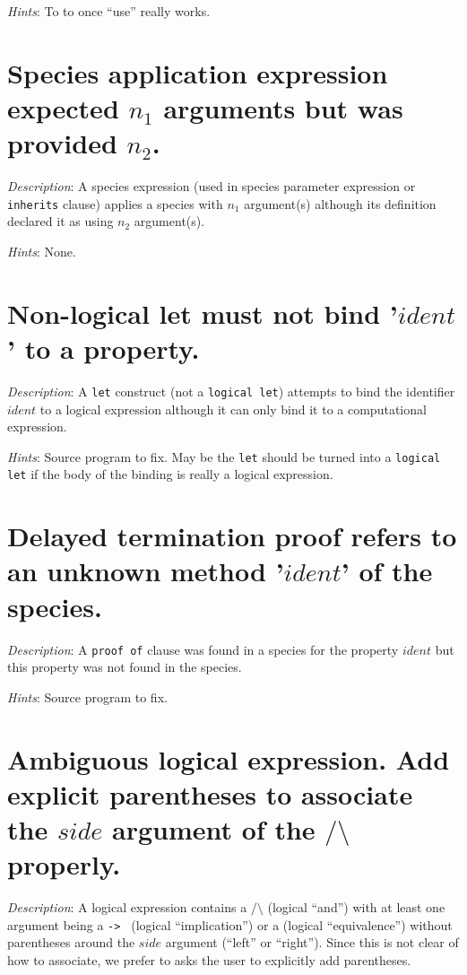 {\em Hints}: {\color{red}To to once ``use'' really works.}



\section*{Species application expression expected $n_1$ arguments but
  was provided $n_2$.}
{\em Description}: A species expression (used in species parameter
expression or {\tt inherits} clause) applies a species with $n_1$
argument(s) although its definition declared it as using $n_2$
argument(s).

{\em Hints}: None.



\section*{Non-logical let must not bind '$ident$' to a property.}
{\em Description}: A {\tt let} construct (not a {\tt logical let})
attempts to bind the identifier $ident$ to a logical expression
although it can only bind it to a computational expression.

{\em Hints}: Source program to fix. May be the {\tt let} should be
turned into a {\tt logical let} if the body of the binding is really a
logical expression.



\section*{Delayed termination proof refers to an unknown method
  '$ident$' of the species.}
{\em Description}: A {\tt proof of} clause was found in a species for
the property $ident$ but this property was not found in the species.

{\em Hints}: Source program to fix.



\section*{Ambiguous logical expression. Add explicit parentheses to
  associate the $side$ argument of the $/\setminus$ properly.}
{\em Description}: A logical expression contains a
{\tt $/\setminus$} (logical ``and'') with at least one argument being a
{\tt -> } (logical ``implication'') or a {\tt <->} (logical
``equivalence'') without parentheses around the $side$ argument (``left''
or ``right''). Since this is not clear of how to associate, we prefer
to asks the user to explicitly add parentheses.

